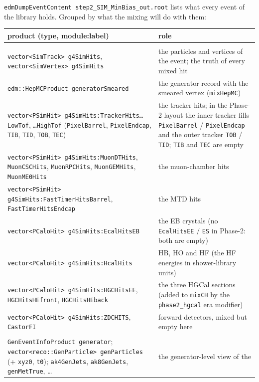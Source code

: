 \documentclass[11pt,a4paper]{article}
\newcommand{\code}[1]{\texttt{#1}}
\begin{document}
\code{edmDumpEventContent step2\_SIM\_MinBias\_out.root} lists what every event of the library holds. Grouped
by what the mixing will do with them:
\begin{center}\small
\begin{tabularx}{\textwidth}{>{\raggedright\arraybackslash\hyphenpenalty=10000}p{70mm}X}
\toprule
product (type, module:label) & role \\
\midrule
\multicolumn{2}{l}{\emph{read by the mixing (the \code{mixObjects} of the \code{MixingModule})}} \\
\code{vector<SimTrack> g4SimHits}, \code{vector<SimVertex> g4SimHits} & the particles and vertices of the
  event; the truth of every mixed hit \\
\code{edm::HepMCProduct generatorSmeared} & the generator record with the smeared vertex (\code{mixHepMC}) \\
\code{vector<PSimHit> g4SimHits:TrackerHits\ldots{}LowTof}, \code{\ldots{}HighTof} (\code{PixelBarrel}, \code{PixelEndcap}, \code{TIB}, \code{TID}, \code{TOB}, \code{TEC}) & the tracker hits; in the
  Phase-2 layout the inner tracker fills \code{PixelBarrel} / \code{PixelEndcap} and the outer tracker
  \code{TOB} / \code{TID}; \code{TIB} and \code{TEC} are empty \\
\code{vector<PSimHit> g4SimHits:MuonDTHits}, \code{MuonCSCHits}, \code{MuonRPCHits}, \code{MuonGEMHits}, \code{MuonME0Hits} & the muon-chamber hits \\
\code{vector<PSimHit> g4SimHits:FastTimerHitsBarrel}, \code{FastTimerHitsEndcap} & the MTD hits \\
\code{vector<PCaloHit> g4SimHits:EcalHitsEB} & the EB crystals (no \code{EcalHitsEE} / \code{ES} in Phase-2:
  both are empty) \\
\code{vector<PCaloHit> g4SimHits:HcalHits} & HB, HO and HF (the HF energies in shower-library units) \\
\code{vector<PCaloHit> g4SimHits:HGCHitsEE}, \code{HGCHitsHEfront}, \code{HGCHitsHEback} & the three HGCal sections (added to
  \code{mixCH} by the \code{phase2\_hgcal} era modifier) \\
\code{vector<PCaloHit> g4SimHits:ZDCHITS}, \code{CastorFI} & forward detectors, mixed but empty here \\
\midrule
\multicolumn{2}{l}{\emph{carried along, not mixed}} \\
\code{GenEventInfoProduct generator}; \code{vector<reco::GenParticle> genParticles} (+ \code{xyz0}, \code{t0}); \code{ak4GenJets}, \code{ak8GenJets}, \code{genMetTrue}, \ldots & the generator-level view of the

\end{tabularx}
\end{center}
\end{document}
